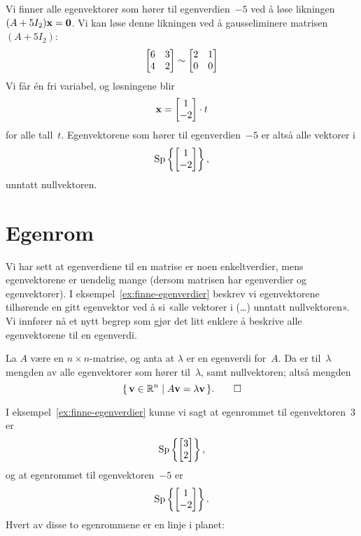 \begin{ex}
Vi finner alle egenvektorer som hører til egenverdien~$-5$ ved å løse
likningen $(A + 5I_2) \mathbf{x} = \mathbf{0}$.  Vi kan løse denne likningen ved
å gausseliminere matrisen $(A + 5I_2)$:
\[
\begin{bmatrix}
6 & 3 \\
4 & 2
\end{bmatrix}
\sim
\begin{bmatrix}
2 & 1 \\
0 & 0
\end{bmatrix}
\]
Vi får én fri variabel, og løsningene blir
\[
\mathbf{x} = \begin{bmatrix} 1 \\ -2 \end{bmatrix} \cdot t
\]
for alle tall~$t$.  Egenvektorene som hører til egenverdien~$-5$ er
altså alle vektorer i
\[
\operatorname{Sp} \left\{ \begin{bmatrix} 1 \\ -2 \end{bmatrix} \right\},
\]
unntatt nullvektoren.
\end{ex}


\section*{Egenrom}

Vi har sett at egenverdiene til en matrise er noen enkeltverdier, mens
egenvektorene er uendelig mange (dersom matrisen har egenverdier og
egenvektorer).  I eksempel~\ref{ex:finne-egenverdier} beskrev vi
egenvektorene tilhørende en gitt egenvektor ved å si «alle vektorer i
(\ldots) unntatt nullvektoren».  Vi innfører nå et nytt begrep som
gjør det litt enklere å beskrive alle egenvektorene til en egenverdi.

\begin{defn}
La $A$ være en $n \times n$-matrise, og anta at $\lambda$ er en
egenverdi for~$A$.  Da er  til~$\lambda$ mengden
av alle egenvektorer som hører til~$\lambda$, samt nullvektoren; altså
mengden
\[
\{\, \mathbf{v} \in \mathbb{R}^n \mid A \mathbf{v} = \lambda \mathbf{v} \,\}.\qedhere
\]
\end{defn}


\begin{ex}
I eksempel~\ref{ex:finne-egenverdier} kunne vi sagt at egenrommet til
egenvektoren~$3$ er
\[
\operatorname{Sp} \left\{ \begin{bmatrix} 3 \\ 2 \end{bmatrix} \right\},
\]
og at egenrommet til egenvektoren~$-5$ er
\[
\operatorname{Sp} \left\{ \begin{bmatrix} 1 \\ -2 \end{bmatrix} \right\}.
\]
Hvert av disse to egenrommene er en linje i planet:
\begin{center}
\end{center}
\vspace{-20pt}
\end{ex}

